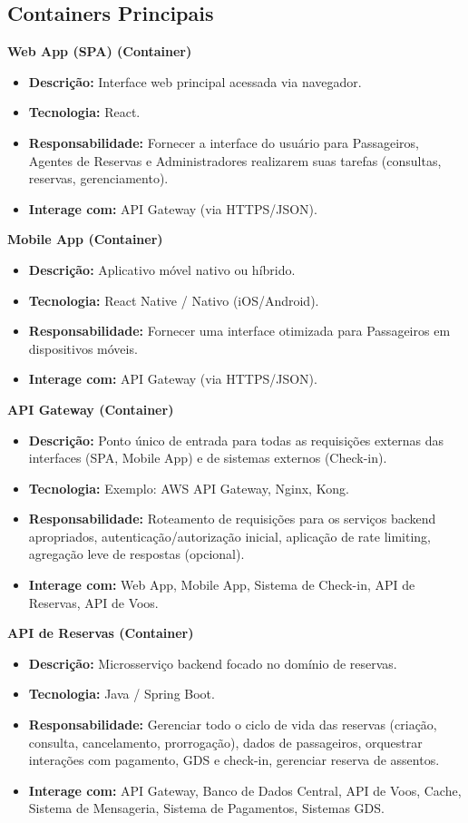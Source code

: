 \subsection{Containers Principais}
\label{subsec:c4-container-principais}

\textbf{Web App (SPA) (Container)}
\begin{itemize}
    \item \textbf{Descrição:} Interface web principal acessada via navegador.
    \item \textbf{Tecnologia:} React.
    \item \textbf{Responsabilidade:} Fornecer a interface do usuário para Passageiros, Agentes de Reservas e Administradores realizarem suas tarefas (consultas, reservas, gerenciamento).
    \item \textbf{Interage com:} API Gateway (via HTTPS/JSON).
\end{itemize}

\textbf{Mobile App (Container)}
\begin{itemize}
    \item \textbf{Descrição:} Aplicativo móvel nativo ou híbrido.
    \item \textbf{Tecnologia:} React Native / Nativo (iOS/Android).
    \item \textbf{Responsabilidade:} Fornecer uma interface otimizada para Passageiros em dispositivos móveis.
    \item \textbf{Interage com:} API Gateway (via HTTPS/JSON).
\end{itemize}

\textbf{API Gateway (Container)}
\begin{itemize}
    \item \textbf{Descrição:} Ponto único de entrada para todas as requisições externas das interfaces (SPA, Mobile App) e de sistemas externos (Check-in).
    \item \textbf{Tecnologia:} Exemplo: AWS API Gateway, Nginx, Kong.
    \item \textbf{Responsabilidade:} Roteamento de requisições para os serviços backend apropriados, autenticação/autorização inicial, aplicação de rate limiting, agregação leve de respostas (opcional).
    \item \textbf{Interage com:} Web App, Mobile App, Sistema de Check-in, API de Reservas, API de Voos.
\end{itemize}

\textbf{API de Reservas (Container)}
\begin{itemize}
    \item \textbf{Descrição:} Microsserviço backend focado no domínio de reservas.
    \item \textbf{Tecnologia:} Java / Spring Boot.
    \item \textbf{Responsabilidade:} Gerenciar todo o ciclo de vida das reservas (criação, consulta, cancelamento, prorrogação), dados de passageiros, orquestrar interações com pagamento, GDS e check-in, gerenciar reserva de assentos.
    \item \textbf{Interage com:} API Gateway, Banco de Dados Central, API de Voos, Cache, Sistema de Mensageria, Sistema de Pagamentos, Sistemas GDS.
\end{itemize}

